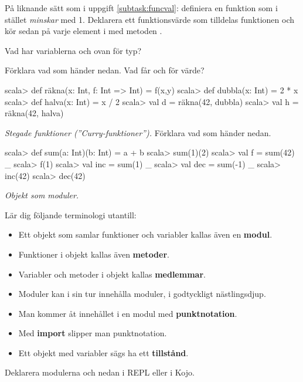\Subtask På liknande sätt som i uppgift \ref{subtask:funcval}: definiera en funktion  som i stället \emph{minskar} med 1. Deklarera ett funktionsvärde  som tilldelas funktionen  och kör sedan  på varje element i  med metoden .

\Subtask\Pen Vad har variablerna  och  ovan för typ?

\Subtask Förklara vad som händer nedan. Vad får  och  för värde?

\begin{REPL}
scala> def räkna(x: Int, f: Int => Int) = f(x,y)
scala> def dubbla(x: Int) = 2 * x
scala> def halva(x: Int) = x / 2
scala> val d = räkna(42, dubbla)
scala> val h = räkna(42, halva)
\end{REPL}

\Task\emph{Stegade funktioner (''Curry-funktioner'').} Förklara vad som händer nedan.
\begin{REPL}
scala> def sum(a: Int)(b: Int) = a + b
scala> sum(1)(2)
scala> val f = sum(42) _
scala> f(1)
scala> val inc = sum(1) _
scala> val dec = sum(-1) _
scala> inc(42)
scala> dec(42)
\end{REPL}

\Task \emph{Objekt som moduler.} 

\Subtask Lär dig följande terminologi utantill: 

\begin{itemize}[noitemsep, nolistsep]
\item Ett objekt som samlar funktioner och variabler kallas även en \textbf{modul}. 
\item Funktioner i objekt kallas även \textbf{metoder}. 
\item Variabler och metoder i objekt kallas \textbf{medlemmar}. 
\item Moduler kan i sin tur innehålla moduler, i godtyckligt nästlingsdjup. 
\item Man kommer åt innehållet i en modul med \textbf{punktnotation}. 
\item Med \textbf{import} slipper man punktnotation. 
\item Ett objekt med variabler sägs ha ett \textbf{tillstånd}.
\end{itemize}

\Subtask Deklarera modulerna  och  nedan i REPL eller i Kojo. 

